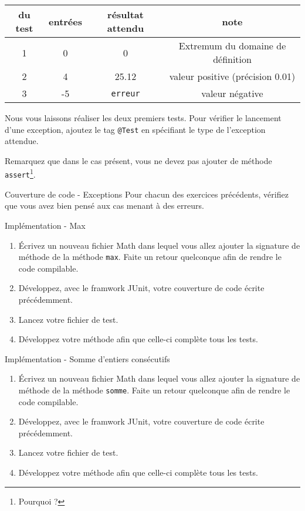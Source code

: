 \documentclass[a4paper,11pt]{article}
\begin{document}
	\begin{center}
		\begin{tabular}{|c|c|c|c|}
			\hline
			\no du test & entrées & résultat attendu & note \\
			\hline
			1 & 0 & 0 & Extremum du domaine de définition \\
			\hline
			2 & 4 & 25.12 & valeur positive (précision 0.01) \\
			\hline
			3 & -5 & \texttt{erreur} & valeur négative \\
			\hline
		\end{tabular}
	\end{center}

	Nous vous laissons réaliser les deux premiers tests. Pour vérifier le lancement d'une exception, ajoutez le tag \texttt{@Test} en spécifiant le type de l'exception attendue.

	Remarquez que dans le cas présent, vous ne devez pas ajouter de méthode \texttt{assert}\footnote{Pourquoi ?}.

	\begin{Exercice}{Couverture de code - Exceptions}
		Pour chacun des exercices précédents, vérifiez que vous avez bien pensé aux cas menant à des erreurs.
	\end{Exercice}

	\begin{Exercice}{Implémentation - Max}
		\begin{enumerate}
			\item Écrivez un nouveau fichier Math dans lequel vous allez ajouter la signature de méthode de la méthode \texttt{max}. Faite un retour quelconque afin de rendre le code compilable.
			\item Développez, avec le framwork JUnit, votre couverture de code écrite précédemment.
			\item Lancez votre fichier de test.
			\item Développez votre méthode afin que celle-ci complète tous les tests.
		\end{enumerate}
	\end{Exercice}

	\begin{Exercice}{Implémentation - Somme d'entiers consécutifs}
		\begin{enumerate}
			\item Écrivez un nouveau fichier Math dans lequel vous allez ajouter la signature de méthode de la méthode \texttt{somme}. Faite un retour quelconque afin de rendre le code compilable.
			\item Développez, avec le framwork JUnit, votre couverture de code écrite précédemment.
			\item Lancez votre fichier de test.
			\item Développez votre méthode afin que celle-ci complète tous les tests.
		\end{enumerate}
	\end{Exercice}
	
\end{document}
